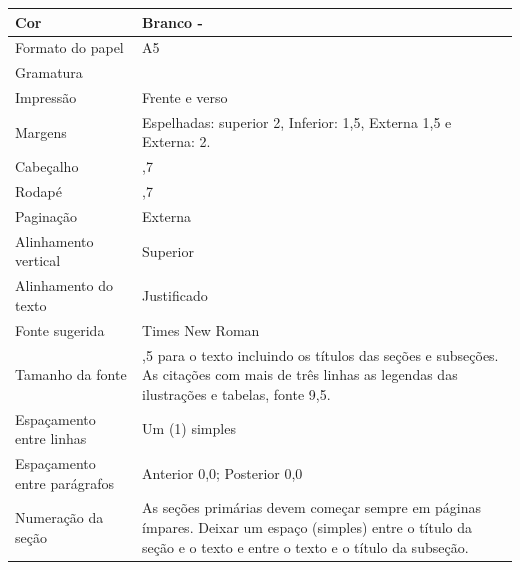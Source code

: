 \begin{tabularx}{\linewidth}{>{\RaggedRight}p{3cm}|>{\arraybackslash}X}
    Cor                          & Branco -                                                 \\ \hline
    Formato do papel             & A5                                                               \\ \hline
    Gramatura                    & 75                                                               \\ \hline
    Impressão                    & Frente e verso                                                   \\ \hline
    Margens                      & Espelhadas: superior 2, Inferior: 1,5, Externa 1,5 e Externa: 2. \\ \hline
    Cabeçalho                    & 0,7                                                              \\ \hline
    Rodapé                       & 0,7                                                              \\ \hline
    Paginação                    & Externa                                                          \\ \hline
    Alinhamento vertical         & Superior                                                         \\ \hline
    Alinhamento do texto         & Justificado                                                      \\ \hline
    Fonte sugerida               & Times New Roman                                                  \\ \hline
    Tamanho da fonte             & 10,5 para o texto incluindo os títulos das seções e subseções.
                                   As citações com mais de três linhas as legendas das ilustrações
                                   e tabelas, fonte 9,5.                                            \\ \hline
    Espaçamento entre linhas     & Um (1) simples                                                   \\ \hline
    Espaçamento entre parágrafos & Anterior 0,0; Posterior 0,0                                      \\ \hline
    Numeração da seção           & As seções  primárias devem  começar  sempre em páginas ímpares.
                                   Deixar um espaço (simples) entre o título da seção e o texto e
                                   entre o texto e o título da subseção.                            \\ \hline

\end{tabularx}




